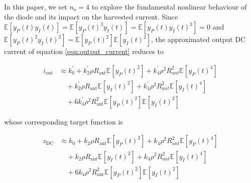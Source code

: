 In this paper, we set ${n_o} = 4$ to explore the fundamental nonlinear behaviour of the diode and its impact on the harvested current. Since $\mathbb{E}\left[ {{y_P}(t){y_I}(t)} \right] = \mathbb{E}\left[ {{y_P}{{(t)}^3}{y_I}(t)} \right] = \mathbb{E}\left[ {{y_P}(t){y_I}{{(t)}^3}} \right] = 0$ and $\mathbb{E}\left[ {{y_P}{{(t)}^2}{y_I}{{(t)}^2}} \right] = \mathbb{E}\left[ {{y_P}{{(t)}^2}} \right]\mathbb{E}\left[ {{y_I}{{(t)}^2}} \right]$, the approximated output DC current of equation \ref{eqn:output_current} reduces to

\begin{align}\label{eqn:output_current_truncated}
  {i_{\text{out}}} &\approx k_0^\prime  + k_2^\prime \rho {R_{{\text{ant}}}}\mathbb{E}\left[ {{y_P}{{(t)}^2}} \right] + k_4^\prime {\rho ^2}R_{ant}^2\mathbb{E}\left[ {{y_P}{{(t)}^4}} \right] \nonumber \\
   &\quad + k_2^\prime \rho {R_{{\text{ant}}}}\mathbb{E}\left[ {{y_I}{{(t)}^2}} \right] + k_4^\prime {\rho ^2}R_{ant}^2\mathbb{E}\left[ {{y_I}{{(t)}^4}} \right] \nonumber \\
   &\quad + 6k_4^\prime {\rho ^2}R_{{\text{ant}}}^2\mathbb{E}\left[ {{y_P}{{(t)}^2}} \right]\mathbb{E}\left[ {{y_I}{{(t)}^2}} \right]
\end{align}

whose corresponding target function is

\begin{align}\label{eqn:target_function_truncated}
  {z_{\text{DC}}} &\approx k_0  + k_2 \rho {R_{{\text{ant}}}}\mathbb{E}\left[ {{y_P}{{(t)}^2}} \right] + k_4 {\rho ^2}R_{ant}^2\mathbb{E}\left[ {{y_P}{{(t)}^4}} \right] \nonumber \\
   &\quad + k_2 \rho {R_{{\text{ant}}}}\mathbb{E}\left[ {{y_I}{{(t)}^2}} \right] + k_4 {\rho ^2}R_{ant}^2\mathbb{E}\left[ {{y_I}{{(t)}^4}} \right] \nonumber \\
   &\quad + 6k_4 {\rho ^2}R_{{\text{ant}}}^2\mathbb{E}\left[ {{y_P}{{(t)}^2}} \right]\mathbb{E}\left[ {{y_I}{{(t)}^2}} \right]
\end{align} 